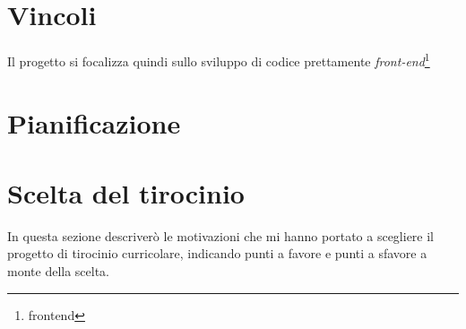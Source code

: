 \section{Vincoli}

Il progetto si focalizza quindi sullo sviluppo di codice prettamente \textit{front-end}\footnote{\gls{frontend}}

\section{Pianificazione}

\section{Scelta del tirocinio}

In questa sezione descriverò le motivazioni che mi hanno portato a scegliere il progetto di tirocinio curricolare, indicando punti a favore e punti a sfavore a monte della scelta.